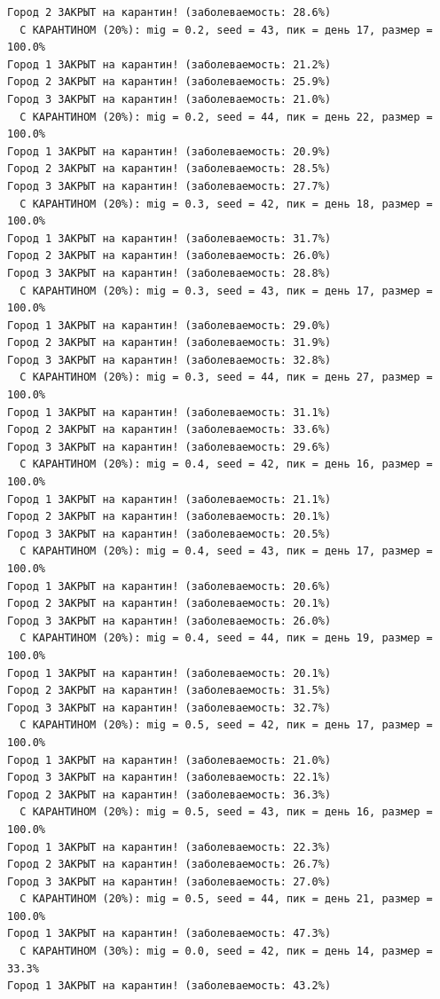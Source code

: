 \documentclass[
  12pt,
  a4paper,
  DIV=11,
  numbers=noendperiod]{scrreprt}
\begin{document}
\begin{verbatim}
Город 2 ЗАКРЫТ на карантин! (заболеваемость: 28.6%)
  С КАРАНТИНОМ (20%): mig = 0.2, seed = 43, пик = день 17, размер = 100.0%
Город 1 ЗАКРЫТ на карантин! (заболеваемость: 21.2%)
Город 2 ЗАКРЫТ на карантин! (заболеваемость: 25.9%)
Город 3 ЗАКРЫТ на карантин! (заболеваемость: 21.0%)
  С КАРАНТИНОМ (20%): mig = 0.2, seed = 44, пик = день 22, размер = 100.0%
Город 1 ЗАКРЫТ на карантин! (заболеваемость: 20.9%)
Город 2 ЗАКРЫТ на карантин! (заболеваемость: 28.5%)
Город 3 ЗАКРЫТ на карантин! (заболеваемость: 27.7%)
  С КАРАНТИНОМ (20%): mig = 0.3, seed = 42, пик = день 18, размер = 100.0%
Город 1 ЗАКРЫТ на карантин! (заболеваемость: 31.7%)
Город 2 ЗАКРЫТ на карантин! (заболеваемость: 26.0%)
Город 3 ЗАКРЫТ на карантин! (заболеваемость: 28.8%)
  С КАРАНТИНОМ (20%): mig = 0.3, seed = 43, пик = день 17, размер = 100.0%
Город 1 ЗАКРЫТ на карантин! (заболеваемость: 29.0%)
Город 2 ЗАКРЫТ на карантин! (заболеваемость: 31.9%)
Город 3 ЗАКРЫТ на карантин! (заболеваемость: 32.8%)
  С КАРАНТИНОМ (20%): mig = 0.3, seed = 44, пик = день 27, размер = 100.0%
Город 1 ЗАКРЫТ на карантин! (заболеваемость: 31.1%)
Город 2 ЗАКРЫТ на карантин! (заболеваемость: 33.6%)
Город 3 ЗАКРЫТ на карантин! (заболеваемость: 29.6%)
  С КАРАНТИНОМ (20%): mig = 0.4, seed = 42, пик = день 16, размер = 100.0%
Город 1 ЗАКРЫТ на карантин! (заболеваемость: 21.1%)
Город 2 ЗАКРЫТ на карантин! (заболеваемость: 20.1%)
Город 3 ЗАКРЫТ на карантин! (заболеваемость: 20.5%)
  С КАРАНТИНОМ (20%): mig = 0.4, seed = 43, пик = день 17, размер = 100.0%
Город 1 ЗАКРЫТ на карантин! (заболеваемость: 20.6%)
Город 2 ЗАКРЫТ на карантин! (заболеваемость: 20.1%)
Город 3 ЗАКРЫТ на карантин! (заболеваемость: 26.0%)
  С КАРАНТИНОМ (20%): mig = 0.4, seed = 44, пик = день 19, размер = 100.0%
Город 1 ЗАКРЫТ на карантин! (заболеваемость: 20.1%)
Город 2 ЗАКРЫТ на карантин! (заболеваемость: 31.5%)
Город 3 ЗАКРЫТ на карантин! (заболеваемость: 32.7%)
  С КАРАНТИНОМ (20%): mig = 0.5, seed = 42, пик = день 17, размер = 100.0%
Город 1 ЗАКРЫТ на карантин! (заболеваемость: 21.0%)
Город 3 ЗАКРЫТ на карантин! (заболеваемость: 22.1%)
Город 2 ЗАКРЫТ на карантин! (заболеваемость: 36.3%)
  С КАРАНТИНОМ (20%): mig = 0.5, seed = 43, пик = день 16, размер = 100.0%
Город 1 ЗАКРЫТ на карантин! (заболеваемость: 22.3%)
Город 2 ЗАКРЫТ на карантин! (заболеваемость: 26.7%)
Город 3 ЗАКРЫТ на карантин! (заболеваемость: 27.0%)
  С КАРАНТИНОМ (20%): mig = 0.5, seed = 44, пик = день 21, размер = 100.0%
Город 1 ЗАКРЫТ на карантин! (заболеваемость: 47.3%)
  С КАРАНТИНОМ (30%): mig = 0.0, seed = 42, пик = день 14, размер = 33.3%
Город 1 ЗАКРЫТ на карантин! (заболеваемость: 43.2%)

\end{verbatim}
\end{document}
